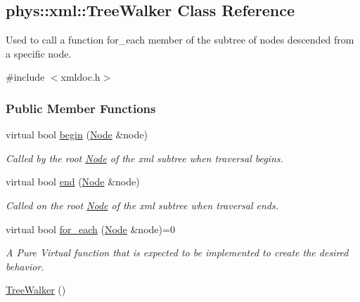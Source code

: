 \hypertarget{classphys_1_1xml_1_1TreeWalker}{
\subsection{phys::xml::TreeWalker Class Reference}
\label{classphys_1_1xml_1_1TreeWalker}
}


Used to call a function for\_\-each member of the subtree of nodes descended from a specific node.  




{\ttfamily \#include $<$xmldoc.h$>$}

\subsubsection*{Public Member Functions}
\begin{DoxyCompactItemize}
\item 
virtual bool \hyperlink{classphys_1_1xml_1_1TreeWalker_a649d9e5a06542be0282d3d20994a62fc}{begin} (\hyperlink{classphys_1_1xml_1_1Node}{Node} \&node)
\begin{DoxyCompactList}\small\item\em Called by the root \hyperlink{classphys_1_1xml_1_1Node}{Node} of the xml subtree when traversal begins. \item\end{DoxyCompactList}\item 
virtual bool \hyperlink{classphys_1_1xml_1_1TreeWalker_a210f6d60579a152f89e651be797885b9}{end} (\hyperlink{classphys_1_1xml_1_1Node}{Node} \&node)
\begin{DoxyCompactList}\small\item\em Called on the root \hyperlink{classphys_1_1xml_1_1Node}{Node} of the xml subtree when traversal ends. \item\end{DoxyCompactList}\item 
virtual bool \hyperlink{classphys_1_1xml_1_1TreeWalker_a03267e73acac44809f16739fd00a536d}{for\_\-each} (\hyperlink{classphys_1_1xml_1_1Node}{Node} \&node)=0
\begin{DoxyCompactList}\small\item\em A Pure Virtual function that is expected to be implemented to create the desired behavior. \item\end{DoxyCompactList}\item 
\hypertarget{classphys_1_1xml_1_1TreeWalker_a5b4e97d7a0b433770431f8ebd8fc6489}{
\hyperlink{classphys_1_1xml_1_1TreeWalker_a5b4e97d7a0b433770431f8ebd8fc6489}{TreeWalker} ()}
\label{classphys_1_1xml_1_1TreeWalker_a5b4e97d7a0b433770431f8ebd8fc6489}


\end{DoxyCompactItemize}
